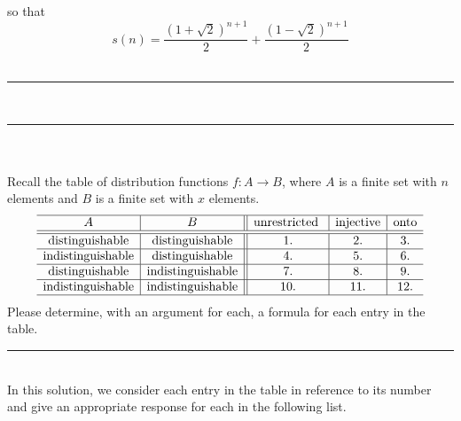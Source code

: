 \documentclass{article}
\newcommand{\problemsep}{\leavevmode\\[0.05in] \rule[\baselineskip/4]{\textwidth}{1pt} \\[0.005in] \rule[\baselineskip]{\textwidth}{1pt}\vspace{-\baselineskip/2}\leavevmode\\[0.05in]}
\newcommand{\statementsep}{\leavevmode\\[0.005in] \rule[\baselineskip/4]{\textwidth}{0.4pt}\leavevmode\\[0.005in]}
\begin{document}
so that 
\begin{equation*}
	s(n) = \frac{\left (1 + \sqrt{2} \right )^{n + 1}}{2} + \frac{\left (1 - \sqrt{2} \right )^{n + 1}}{2}
\end{equation*}
\problemsep
\noindent \maltese \hspace{1ex}{\bf Sub-Experience Three: The Master Table of Distributions.} \\
\noindent  Recall the table of distribution functions $f:A \to B$, where $A$ is a 
finite set with $n$ elements and $B$ is a finite set with $x$ elements.
\begin{equation*}
\begin{array}{c|c||c|c|c}
\hline A & B & \mbox{unrestricted }& \mbox{injective}& \mbox{onto} \\ \hline \hline
\mbox{distinguishable} & \mbox{distinguishable} & 1. & 2. & 3. \\ \hline
\mbox{indistinguishable}& \mbox{distinguishable}&4.&5.&6. \\ \hline
\mbox{distinguishable} & \mbox{indistinguishable}& 7. & 8. & 9. \\ \hline
\mbox{indistinguishable}&\mbox{indistinguishable}& 10. &11.&12. \\ \hline 
\end{array}\end{equation*}
\noindent Please determine, with an argument for each, a formula for each entry in 
the table.
\statementsep
In this solution, we consider each entry in the table in reference to its number and give an appropriate response for each in the following list.
\end{document}
